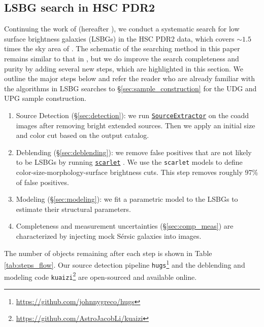 \documentclass[twocolumn,astrosymb,twocolappendix]{aastex631}
\newcommand{\code}[1]{\texttt{#1}}
\newcommand{\sersic}{S\'ersic}
\begin{document}
\begin{CJK*}{UTF8}{gbsn}
\section{LSBG search in HSC PDR2}\label{sec:lsbg_search}

Continuing the work of \citet{Greco2018} (hereafter ), we conduct a systematic search for low surface brightness galaxies (LSBGs) in the HSC PDR2 data, which covers $\sim 1.5$ times the sky area of . The schematic of the searching method in this paper remains similar to that in , but we do improve the search completeness and purity by adding several new steps, which are highlighted in this section. We outline the major steps below and refer the reader who are already familiar with the algorithms in LSBG searches to \S \ref{sec:sample_construction} for the UDG and UPG sample construction.

\begin{enumerate}
    \item Source Detection (\S \ref{sec:detection}): we run \href{https://www.astromatic.net/software/sextractor/}{\code{SourceExtractor}} \citep{Bertin1996} on the coadd images after removing bright extended sources. Then we apply an initial size and color cut based on the output catalog. 
    \item Deblending (\S \ref{sec:deblending}): we remove false positives that are not likely to be LSBGs by running \href{https://pmelchior.github.io/scarlet/}{\code{scarlet}} \citep{Melchior2018}. We use the \code{scarlet} models to define color-size-morphology-surface brightness cuts. This step removes roughly 97\% of false positives.
    \item Modeling (\S \ref{sec:modeling}): we fit a parametric model to the LSBGs to estimate their structural parameters. 
    \item Completeness and measurement uncertainties (\S \ref{sec:comp_meas}) are characterized by injecting mock \sersic{} galaxies into images. 
\end{enumerate}
The number of objects remaining after each step is shown in Table \ref{tab:steps_flow}. Our source detection pipeline \code{hugs}\footnote{\url{https://github.com/johnnygreco/hugs}} and the deblending and modeling code \code{kuaizi}\footnote{\url{https://github.com/AstroJacobLi/kuaizi}} are open-sourced and available online.


\end{CJK*}
\end{document}
